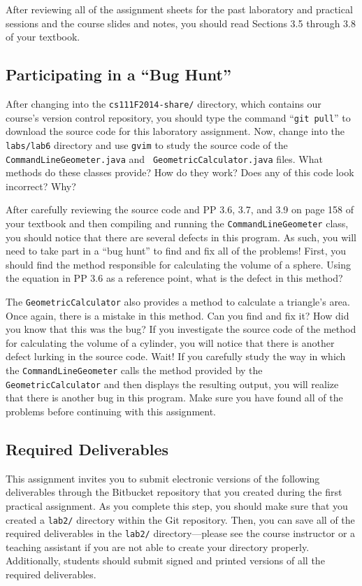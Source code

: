 After reviewing all of the assignment sheets for the past laboratory and practical sessions and the course slides and notes,
you should read Sections 3.5 through 3.8 of your textbook.

\vspace*{-.1in}
\subsection*{Participating in a ``Bug Hunt''}

After changing into the {\tt cs111F2014-share/} directory, which contains our course's version control repository, you
should type the command ``{\tt git pull}'' to download the source code for this laboratory assignment. Now, change into
the {\tt labs/lab6} directory and use {\tt gvim} to study the source code of the {\tt CommandLineGeometer.java} and {\tt
  GeometricCalculator.java} files. What methods do these classes provide? How do they work? Does any of this code look
incorrect? Why?

After carefully reviewing the source code and PP 3.6, 3.7, and 3.9 on page 158 of your textbook and then compiling and
running the {\tt CommandLineGeometer} class, you should notice that there are several defects in this program. As
such, you will need to take part in a ``bug hunt'' to find and fix all of the problems! First, you should find the
method responsible for calculating the volume of a sphere. Using the equation in PP 3.6 as a reference point, what is
the defect in this method?

The {\tt GeometricCalculator} also provides a method to calculate a triangle's area.  Once again, there is a
mistake in this method.  Can you find and fix it? How did you know that this was the bug? If you investigate the source
code of the method for calculating the volume of a cylinder, you will notice that there is another defect lurking in the
source code. Wait! If you carefully study the way in which the {\tt CommandLineGeometer} calls the method
provided by the {\tt GeometricCalculator} and then displays the resulting output, you will realize that there is another
bug in this program. Make sure you have found all of the problems before continuing with this assignment.

\subsection*{Required Deliverables}

This assignment invites you to submit electronic versions of the following deliverables through the Bitbucket repository
that you created during the first practical assignment.  As you complete this step, you should make sure that you
created a {\tt lab2/} directory within the Git repository.  Then, you can save all of the required deliverables in the
{\tt lab2/} directory---please see the course instructor or a teaching assistant if you are not able to create your
directory properly.  Additionally, students should submit signed and printed versions of all the required deliverables.


